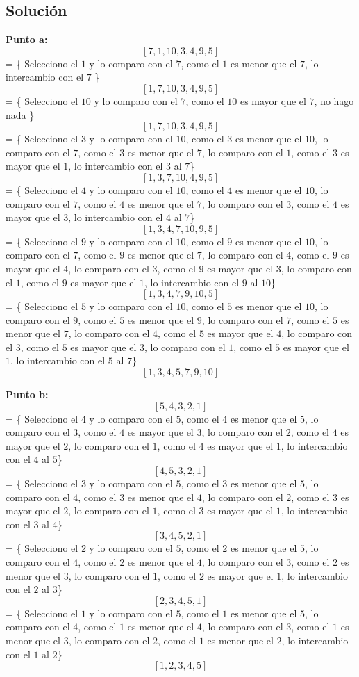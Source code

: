 \documentclass{article}
\begin{document}
\subsection*{Solución}
\textbf{Punto a:}
$$[7, 1, 10, 3, 4, 9, 5]$$
= \{ Selecciono el $1$ y lo comparo con el $7$, como el $1$ es menor que el $7$, lo intercambio con el $7$ \}
$$[1, 7, 10, 3, 4, 9, 5]$$
= \{ Selecciono el $10$ y lo comparo con el $7$, como el $10$ es mayor que el $7$, no hago nada \}
$$[1, 7, 10, 3, 4, 9, 5]$$
= \{ Selecciono el $3$ y lo comparo con el $10$, como el $3$ es menor que el $10$, lo comparo con el $7$, como el $3$ es menor que el $7$, lo comparo con el $1$, como el $3$ es mayor que el $1$, lo intercambio con el $3$ al $7$\}
$$[1, 3, 7, 10, 4, 9, 5]$$
= \{ Selecciono el $4$ y lo comparo con el $10$, como el $4$ es menor que el $10$, lo comparo con el $7$, como el $4$ es menor que el $7$, lo comparo con el $3$, como el $4$ es mayor que el $3$, lo intercambio con el $4$ al $7$\}
$$[1, 3, 4, 7, 10, 9, 5]$$
= \{ Selecciono el $9$ y lo comparo con el $10$, como el $9$ es menor que el $10$, lo comparo con el $7$, como el $9$ es menor que el $7$, lo comparo con el $4$, como el $9$ es mayor que el $4$, lo comparo con el $3$, como el $9$ es mayor que el $3$, lo comparo con el $1$, como el $9$ es mayor que el $1$, lo intercambio con el $9$ al $10$\}
$$[1, 3, 4, 7, 9, 10, 5]$$
= \{ Selecciono el $5$ y lo comparo con el $10$, como el $5$ es menor que el $10$, lo comparo con el $9$, como el $5$ es menor que el $9$, lo comparo con el $7$, como el $5$ es menor que el $7$, lo comparo con el $4$, como el $5$ es mayor que el $4$, lo comparo con el $3$, como el $5$ es mayor que el $3$, lo comparo con el $1$, como el $5$ es mayor que el $1$, lo intercambio con el $5$ al $7$\}
$$[1, 3, 4, 5, 7, 9, 10]$$

\textbf{Punto b:}
$$[5, 4, 3, 2, 1]$$
= \{ Selecciono el $4$ y lo comparo con el $5$, como el $4$ es menor que el $5$, lo comparo con el $3$, como el $4$ es mayor que el $3$, lo comparo con el $2$, como el $4$ es mayor que el $2$, lo comparo con el $1$, como el $4$ es mayor que el $1$, lo intercambio con el $4$ al $5$\}
$$[4, 5, 3, 2, 1]$$
= \{ Selecciono el $3$ y lo comparo con el $5$, como el $3$ es menor que el $5$, lo comparo con el $4$, como el $3$ es menor que el $4$, lo comparo con el $2$, como el $3$ es mayor que el $2$, lo comparo con el $1$, como el $3$ es mayor que el $1$, lo intercambio con el $3$ al $4$\}
$$[3, 4, 5, 2, 1]$$
= \{ Selecciono el $2$ y lo comparo con el $5$, como el $2$ es menor que el $5$, lo comparo con el $4$, como el $2$ es menor que el $4$, lo comparo con el $3$, como el $2$ es menor que el $3$, lo comparo con el $1$, como el $2$ es mayor que el $1$, lo intercambio con el $2$ al $3$\}
$$[2, 3, 4, 5, 1]$$
= \{ Selecciono el $1$ y lo comparo con el $5$, como el $1$ es menor que el $5$, lo comparo con el $4$, como el $1$ es menor que el $4$, lo comparo con el $3$, como el $1$ es menor que el $3$, lo comparo con el $2$, como el $1$ es menor que el $2$, lo intercambio con el $1$ al $2$\}
$$[1, 2, 3, 4, 5]$$
\end{document}
